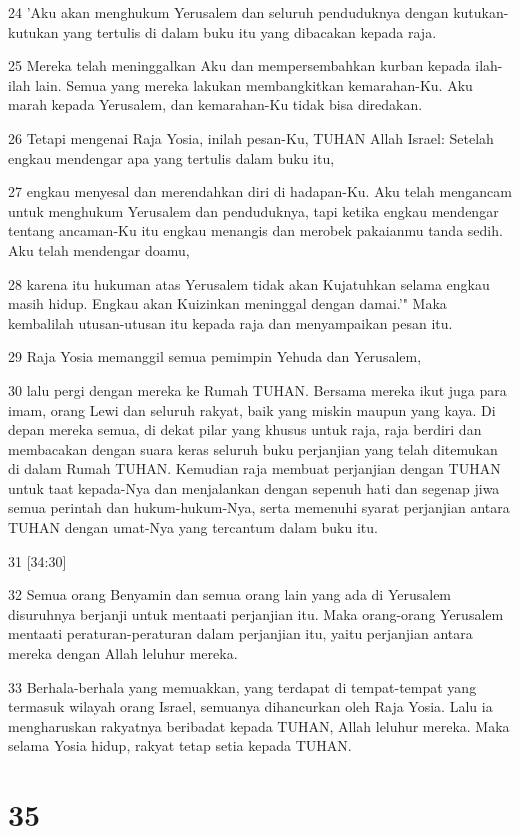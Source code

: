 \par 24 'Aku akan menghukum Yerusalem dan seluruh penduduknya dengan kutukan-kutukan yang tertulis di dalam buku itu yang dibacakan kepada raja.
\par 25 Mereka telah meninggalkan Aku dan mempersembahkan kurban kepada ilah-ilah lain. Semua yang mereka lakukan membangkitkan kemarahan-Ku. Aku marah kepada Yerusalem, dan kemarahan-Ku tidak bisa diredakan.
\par 26 Tetapi mengenai Raja Yosia, inilah pesan-Ku, TUHAN Allah Israel: Setelah engkau mendengar apa yang tertulis dalam buku itu,
\par 27 engkau menyesal dan merendahkan diri di hadapan-Ku. Aku telah mengancam untuk menghukum Yerusalem dan penduduknya, tapi ketika engkau mendengar tentang ancaman-Ku itu engkau menangis dan merobek pakaianmu tanda sedih. Aku telah mendengar doamu,
\par 28 karena itu hukuman atas Yerusalem tidak akan Kujatuhkan selama engkau masih hidup. Engkau akan Kuizinkan meninggal dengan damai.'" Maka kembalilah utusan-utusan itu kepada raja dan menyampaikan pesan itu.
\par 29 Raja Yosia memanggil semua pemimpin Yehuda dan Yerusalem,
\par 30 lalu pergi dengan mereka ke Rumah TUHAN. Bersama mereka ikut juga para imam, orang Lewi dan seluruh rakyat, baik yang miskin maupun yang kaya. Di depan mereka semua, di dekat pilar yang khusus untuk raja, raja berdiri dan membacakan dengan suara keras seluruh buku perjanjian yang telah ditemukan di dalam Rumah TUHAN. Kemudian raja membuat perjanjian dengan TUHAN untuk taat kepada-Nya dan menjalankan dengan sepenuh hati dan segenap jiwa semua perintah dan hukum-hukum-Nya, serta memenuhi syarat perjanjian antara TUHAN dengan umat-Nya yang tercantum dalam buku itu.
\par 31 [34:30]
\par 32 Semua orang Benyamin dan semua orang lain yang ada di Yerusalem disuruhnya berjanji untuk mentaati perjanjian itu. Maka orang-orang Yerusalem mentaati peraturan-peraturan dalam perjanjian itu, yaitu perjanjian antara mereka dengan Allah leluhur mereka.
\par 33 Berhala-berhala yang memuakkan, yang terdapat di tempat-tempat yang termasuk wilayah orang Israel, semuanya dihancurkan oleh Raja Yosia. Lalu ia mengharuskan rakyatnya beribadat kepada TUHAN, Allah leluhur mereka. Maka selama Yosia hidup, rakyat tetap setia kepada TUHAN.

\chapter{35}

